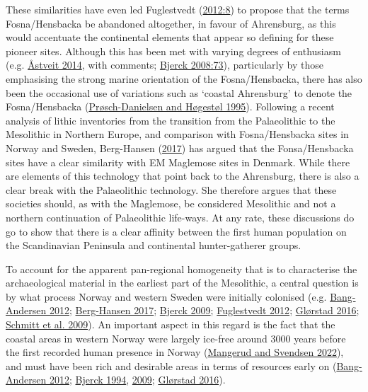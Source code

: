 \documentclass[
  12pt,
  a4paper,
  oneside]{book}
\begin{document}
These similarities have even led Fuglestvedt (\protect\hyperlink{ref-fuglestvedt2012}{2012:8}) to propose that the terms Fosna/Hensbacka be abandoned altogether, in favour of Ahrensburg, as this would accentuate the continental elements that appear so defining for these pioneer sites. Although this has been met with varying degrees of enthusiasm (e.g. \protect\hyperlink{ref-uxe5stveit2014}{Åstveit 2014}, with comments; \protect\hyperlink{ref-bjerck2008}{Bjerck 2008:73}), particularly by those emphasising the strong marine orientation of the Fosna/Hensbacka, there has also been the occasional use of variations such as `coastal Ahrensburg' to denote the Fosna/Hensbacka (\protect\hyperlink{ref-pruxf8sch-danielsen1995}{Prøsch-Danielsen and Høgestøl 1995}). Following a recent analysis of lithic inventories from the transition from the Palaeolithic to the Mesolithic in Northern Europe, and comparison with Fosna/Hensbacka sites in Norway and Sweden, Berg-Hansen (\protect\hyperlink{ref-berg-hansen2017}{2017}) has argued that the Fonsa/Hensbacka sites have a clear similarity with EM Maglemose sites in Denmark. While there are elements of this technology that point back to the Ahrensburg, there is also a clear break with the Palaeolithic technology. She therefore argues that these societies should, as with the Maglemose, be considered Mesolithic and not a northern continuation of Palaeolithic life-ways. At any rate, these discussions do go to show that there is a clear affinity between the first human population on the Scandinavian Peninsula and continental hunter-gatherer groups.

To account for the apparent pan-regional homogeneity that is to characterise the archaeological material in the earliest part of the Mesolithic, a central question is by what process Norway and western Sweden were initially colonised (e.g. \protect\hyperlink{ref-bang-andersen2012}{Bang-Andersen 2012}; \protect\hyperlink{ref-berg-hansen2017}{Berg-Hansen 2017}; \protect\hyperlink{ref-bjerck2009}{Bjerck 2009}; \protect\hyperlink{ref-fuglestvedt2012}{Fuglestvedt 2012}; \protect\hyperlink{ref-glorstad2016}{Glørstad 2016}; \protect\hyperlink{ref-schmitt2009}{Schmitt et al. 2009}). An important aspect in this regard is the fact that the coastal areas in western Norway were largely ice-free around 3000 years before the first recorded human presence in Norway (\protect\hyperlink{ref-mangerud2022}{Mangerud and Svendsen 2022}), and must have been rich and desirable areas in terms of resources early on (\protect\hyperlink{ref-bang-andersen2012}{Bang-Andersen 2012}; \protect\hyperlink{ref-bjerck1994}{Bjerck 1994}, \protect\hyperlink{ref-bjerck2009}{2009}; \protect\hyperlink{ref-glorstad2016}{Glørstad 2016}).
\end{document}

